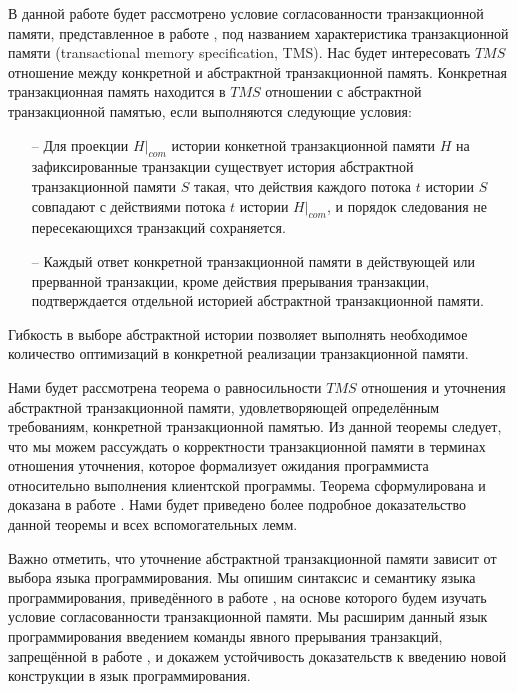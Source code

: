В данной работе будет рассмотрено условие согласованности транзакционной памяти, представленное в работе \cite{tms_article}, под названием характеристика транзакционной памяти (transactional memory specification, TMS). Нас будет интересовать $TMS$ отношение между конкретной и абстрактной транзакционной память. Конкретная транзакционная память находится в $TMS$ отношении с абстрактной транзакционной памятью, если выполняются следующие условия:
\begin{itemize}
\item[--] Для проекции $H|_{com}$ истории конкетной транзакционной памяти $H$ на зафиксированные транзакции существует история абстрактной транзакционной памяти $S$ такая, что действия каждого потока $t$ истории $S$ совпадают с действиями потока $t$ истории $H|_{com}$, и порядок следования не пересекающихся транзакций сохраняется.
\item[--] Каждый ответ конкретной транзакционной памяти в действующей или прерванной транзакции, кроме действия прерывания транзакции, подтверждается отдельной историей абстрактной транзакционной памяти. 
\end{itemize}
Гибкость в выборе абстрактной истории позволяет выполнять необходимое количество оптимизаций в конкретной реализации транзакционной памяти. 

Нами будет рассмотрена теорема о равносильности $TMS$ отношения и уточнения абстрактной транзакционной памяти, удовлетворяющей определённым требованиям, конкретной транзакционной памятью. Из данной теоремы следует, что мы можем рассуждать о корректности транзакционной памяти в терминах отношения уточнения, которое формализует ожидания программиста относительно выполнения клиентской программы. Теорема сформулирована и доказана в работе \cite{tms_article}. Нами будет приведено более подробное доказательство данной теоремы и всех вспомогательных лемм. 

Важно отметить, что уточнение абстрактной транзакционной памяти зависит от выбора языка программирования. Мы опишим синтаксис и семантику языка программирования, приведённого в работе \cite{tms_article}, на основе которого будем изучать условие согласованности транзакционной памяти. Мы расширим данный язык программирования введением команды явного прерывания транзакций, запрещённой в работе \cite{tms_article}, и докажем устойчивость доказательств к введению новой конструкции в язык программирования.


